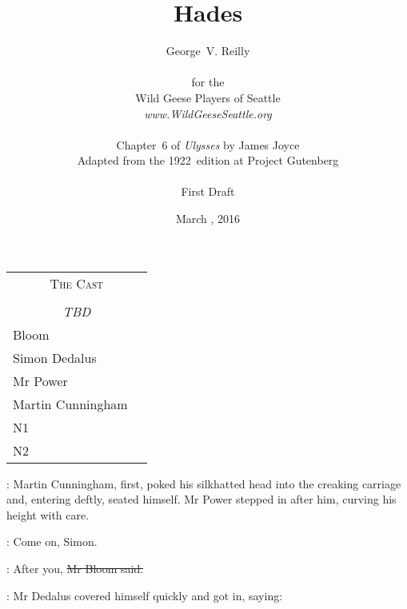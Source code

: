 


\title{\Huge Hades}
\author{George~V. Reilly\\
\\
{\small for the}\\
Wild Geese Players of Seattle\\
{\emph{www.WildGeeseSeattle.org}}\\
\\
{\small Chapter~6 of \emph{Ulysses} by James Joyce}\\
{\small Adapted from the 1922~edition at Project Gutenberg}
\\
\\
{\small First Draft}}
\date{March , 2016}
\raggedbottom



\maketitle
\thispagestyle{empty}
\pagebreak

\begin{tabular}{lp{10cm}}
    \multicolumn{2}{c}{\Large \textsc{The Cast}} \\
\\
    \multicolumn{2}{c}{\large \textit{TBD}} \\
Bloom \\
Simon Dedalus \\
Mr Power \\
Martin Cunningham \\
N1 \\
N2 \\
\end{tabular}

\thispagestyle{empty}
\newpage


\setcounter{page}{1}


:
Martin Cunningham, first,
poked his silkhatted head into the creaking carriage
and, entering deftly, seated himself.
Mr Power stepped in after him,
curving his height with care.

\power:
Come on, Simon.

\Bloom:
After you,
\sout{Mr Bloom said.}

:
Mr Dedalus covered himself quickly and got in, saying:

